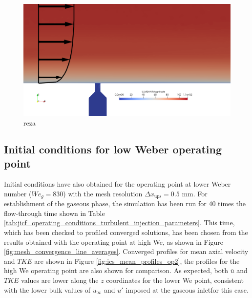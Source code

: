 \begin{figure}[ht]
\centering
\includegraphics[scale=0.2]{./part2_developments/figures_ch5_resolved_JICF/Umean_profile_with_jet}
\caption{reza}
\label{fig:Umean_profile_with_jet}
\end{figure}




\subsection{Initial conditions for low Weber operating point}

Initial conditions have also obtained for the operating point at lower Weber number ($We_g = 830$) with the mesh resolution $\Delta x_\mathrm{ups} = 0.5$ mm. For establishment of the gaseous phase, the simulation has been run for 40 times the flow-through time shown in Table \ref{tab:jicf_operating_conditions_turbulent_injection_parameters}. This time, which has been checked to profiled converged solutions, has been chosen from the results obtained with the operating point at high We, as shown in Figure \ref{fig:mesh_convergence_line_averages}. Converged profiles for mean axial velocity and $TKE$ are shown in Figure \ref{fig:ics_mean_profiles_op2}, the profiles for the high We operating point are also shown for comparison. As expected, both $\overline{u}$ and $TKE$ values are lower along the $z$ coordinates for the lower We point, consistent with the lower bulk values of $u_\infty$ and $u'$ imposed at the gaseous inletfor this case.

